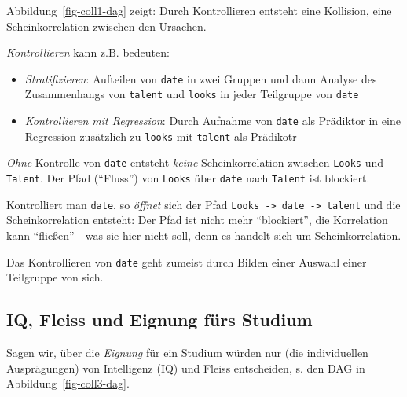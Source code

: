 \documentclass[
  a4paper,
  DIV=11]{scrreprt}
\providecommand{\tightlist}{%
  \setlength{\itemsep}{0pt}\setlength{\parskip}{0pt}}\usepackage{longtable,booktabs,array}
\theoremstyle{definition}
\theoremstyle{remark}
\begin{document}
Abbildung~\ref{fig-coll1-dag} zeigt: Durch Kontrollieren entsteht eine
Kollision, eine Scheinkorrelation zwischen den Ursachen.

\emph{Kontrollieren} kann z.B. bedeuten:

\begin{itemize}
\tightlist
\item
  \emph{Stratifizieren}: Aufteilen von \texttt{date} in zwei Gruppen und
  dann Analyse des Zusammenhangs von \texttt{talent} und \texttt{looks}
  in jeder Teilgruppe von \texttt{date}
\item
  \emph{Kontrollieren mit Regression}: Durch Aufnahme von \texttt{date}
  als Prädiktor in eine Regression zusätzlich zu \texttt{looks} mit
  \texttt{talent} als Prädikotr
\end{itemize}

\emph{Ohne} Kontrolle von \texttt{date} entsteht \emph{keine}
Scheinkorrelation zwischen \texttt{Looks} und \texttt{Talent}. Der Pfad
(``Fluss'') von \texttt{Looks} über \texttt{date} nach \texttt{Talent}
ist blockiert.

Kontrolliert man \texttt{date}, so \emph{öffnet} sich der Pfad
\texttt{Looks\ -\textgreater{}\ date\ -\textgreater{}\ talent} und die
Scheinkorrelation entsteht: Der Pfad ist nicht mehr ``blockiert'', die
Korrelation kann ``fließen'' - was sie hier nicht soll, denn es handelt
sich um Scheinkorrelation.

Das Kontrollieren von \texttt{date} geht zumeist durch Bilden einer
Auswahl einer Teilgruppe von sich.

\hypertarget{iq-fleiss-und-eignung-fuxfcrs-studium}{%
\subsection{IQ, Fleiss und Eignung fürs
Studium}\label{iq-fleiss-und-eignung-fuxfcrs-studium}}

Sagen wir, über die \emph{Eignung} für ein Studium würden nur (die
individuellen Ausprägungen) von Intelligenz (IQ) und Fleiss entscheiden,
s. den DAG in Abbildung~\ref{fig-coll3-dag}.
\end{document}
